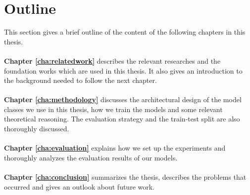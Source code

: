
\section{Outline\label{sec:outline}}

This section gives a brief outline of the content of the following chapters in this
thesis.
\\
\\
\textbf{Chapter \ref{cha:relatedwork}} describes the relevant researches and the
foundation works which are used in this thesis. It also gives an introduction to the
background needed to follow the next chapter.
\\
\\
\textbf{Chapter \ref{cha:methodology}} discusses the architectural design of the model
classes we use in this thesis, how we train the models and some relevant theoretical
reasoning. The evaluation strategy and the train-test split are also thoroughly discussed.
\\
\\
\textbf{Chapter \ref{cha:evaluation}} explains how we set up the experiments and
thoroughly analyzes  the evaluation results of our models.
\\
\\
\textbf{Chapter \ref{cha:conclusion}} summarizes the thesis, describes the problems that
occurred and gives an outlook about future work.
